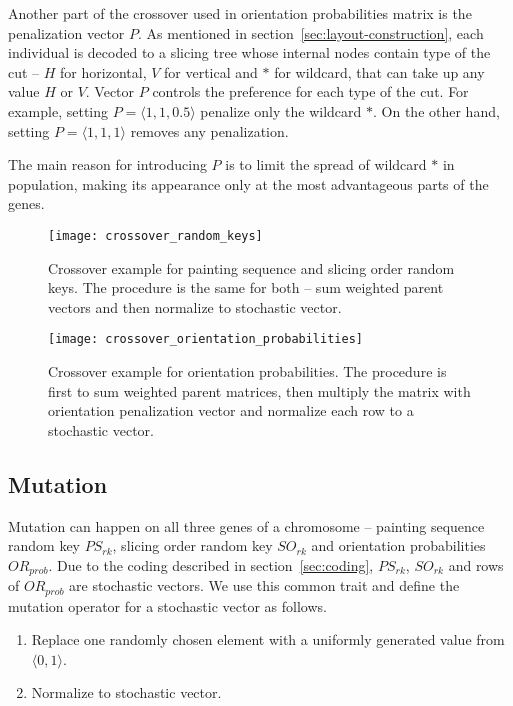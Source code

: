 Another part of the crossover used in orientation probabilities matrix is the penalization vector $P$.
As mentioned in section~\ref{sec:layout-construction}, each individual is decoded to a slicing tree
whose internal nodes contain type of the cut – $H$ for horizontal, $V$ for vertical
and $*$ for wildcard, that can take up any value $H$ or $V$.
Vector $P$ controls the preference for each type of the cut.
For example, setting $P= \langle 1,1,0.5 \rangle$ penalize only the wildcard $*$.
On the other hand, setting $P= \langle 1,1,1 \rangle$ removes any penalization.

The main reason for introducing $P$ is to limit the spread of wildcard $*$ in population,
making its appearance only at the most advantageous parts of the genes.

\begin{figure}[!htp]
    \texttt{[image: crossover\_random\_keys]}\caption{
        Crossover example for painting sequence and slicing order random keys.
        The procedure is the same for both – sum weighted parent vectors and then normalize to stochastic vector.
    }
    \label{fig:crossover-random-keys}
\end{figure}

\begin{figure}[!htp]
    \texttt{[image: crossover\_orientation\_probabilities]}\caption{
        Crossover example for orientation probabilities. The procedure is first to sum weighted parent matrices,
        then multiply the matrix with orientation penalization vector and normalize each row to a stochastic vector.}
    \label{fig:crossover-orientation-probabilities}
\end{figure}

\subsection{Mutation}\label{subsec:mutation}

Mutation can happen on all three genes of a chromosome – painting sequence random key $PS_{rk}$,
slicing order random key $SO_{rk}$ and orientation probabilities $OR_{prob}$.
Due to the coding described in section~\ref{sec:coding}, $PS_{rk}$, $SO_{rk}$ and rows of $OR_{prob}$ are stochastic vectors.
We use this common trait and define the mutation operator for a stochastic vector as follows.

\begin{enumerate}
    \item Replace one randomly chosen element with a uniformly generated value from $\langle 0,1 \rangle$.
    \item Normalize to stochastic vector.
\end{enumerate}

